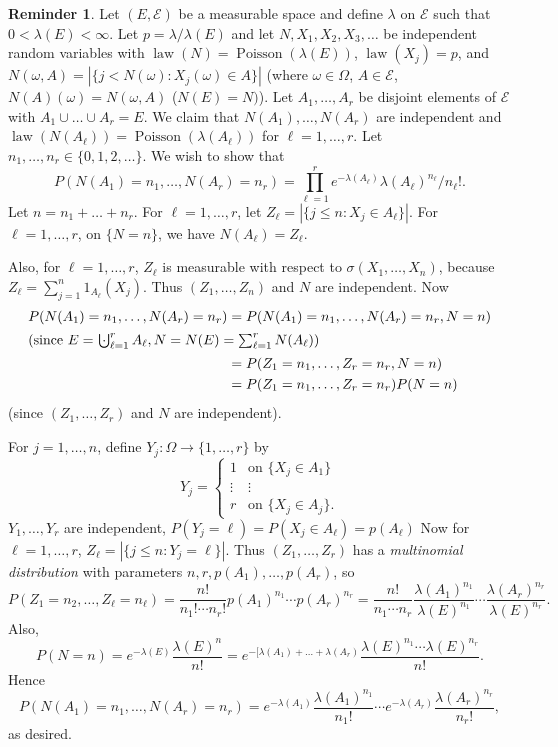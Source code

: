 \documentclass{article}
\DeclareMathOperator{\law}{law}
\DeclareMathOperator{\Poisson}{Poisson}
\newcommand{\bigcupdot}{\mathop{\mathchoice{\hspace{0.45em}}{\hspace{0.35em}}{}{}\cdot\mathchoice{\hspace{-0.85em}}{\hspace{-0.725em}}{}{}\bigcup\limits}}
\theoremstyle{definition}
\newtheorem*{reminder}{Reminder}
\begin{document}
\begin{reminder}
Let $(E, \mathscr{E})$ be a measurable space and define $\lambda$ on $\mathscr{E}$ such that $0 < \lambda(E) < \infty$. Let $p = \lambda/\lambda(E)$ and let $N, X_1, X_2, X_3, \dots$ be independent random variables with $\law(N) = \Poisson(\lambda(E))$, $\law(X_j) = p$, and $N(\omega, A) = |\{j < N(\omega) : X_j(\omega) \in A\}|$ (where $\omega \in \Omega$, $A \in \mathscr{E}$, $N(A)(\omega) = N(\omega, A)$ ($N(E) = N)$). Let $A_1, \dots, A_r$ be disjoint elements of $\mathscr{E}$ with $A_1 \cup \dots \cup A_r = E$. We claim that $N(A_1), \dots, N(A_r)$ are independent and $\law(N(A_\ell)) = \Poisson(\lambda(A_\ell))$ for $\ell = 1, \dots, r$. Let $n_1, \dots, n_r \in \{0, 1, 2, \dots\}$. We wish to show that \[
    P(N(A_1) = n_1, \dots, N(A_r) = n_r) = \prod_{\ell=1}^re^{-\lambda(A_\ell)}\lambda(A_\ell)^{n_\ell}/n_\ell!.
\]
Let $n = n_1 + \dots + n_r$. For $\ell = 1, \dots, r$, let $Z_\ell = |\{j \leq n : X_j \in A_\ell\}|$. For $\ell = 1, \dots, r$, on $\{N = n\}$, we have $N(A_\ell) = Z_\ell$.
\end{reminder}
Also, for $\ell = 1, \dots, r$, $Z_\ell$ is measurable with respect to $\sigma(X_1, \dots, X_n)$, because $Z_\ell = \sum_{j=1}^n 1_{A_\ell} (X_j)$. Thus $(Z_1, \dots, Z_n)$ and $N$ are independent. Now
\begin{align*}
    P(N(A_1) = n_1, \dots, N(A_r) = n_r) &= P(N(A_1) = n_1, \dots, N(A_r) = n_r, N = n) \\
    \intertext{(since $E = \bigcupdot_{\ell = 1}^r A_{\ell}, N = N(E) = \sum_{\ell = 1}^r N(A_\ell)$)}
    &= P(Z_1 = n_1, \dots, Z_r = n_r, N = n) \\
    &= P(Z_1 = n_1, \dots, Z_r = n_r)P(N = n)
\end{align*}
(since $(Z_1, \dots, Z_r)$ and $N$ are independent).

For $j = 1, \dots, n$, define $Y_j : \Omega \to \{1, \dots, r\}$ by
\[
    Y_j = \begin{cases}
        1 &\text{on } \{X_j \in A_1\} \\
        \vdots & \vdots \\
        r &\text{on } \{X_j \in A_j\}.
    \end{cases}
\]
$Y_1, \dots, Y_r$ are independent, $P(Y_j = \ell) = P(X_j \in A_\ell) = p(A_\ell)$
Now for $\ell = 1, \dots, r$, $Z_\ell = |\{j \leq n : Y_j = \ell\}|$. Thus $(Z_1, \dots, Z_r)$ has a \emph{multinomial distribution} with parameters $n, r, p(A_1), \dots, p(A_r)$, so
\[
    P(Z_1 = n_2, \dots, Z_\ell = n_\ell) = \frac{n!}{n_1! \cdots n_r!} p(A_1)^{n_1} \cdots p(A_r)^{n_r} = \frac{n!}{n_1 \cdots n_r} \frac{\lambda(A_1)^{n_1}}{\lambda(E)^{n_1}} \cdots \frac{\lambda(A_r)^{n_r}}{\lambda(E)^{n_r}}.
\]
Also,
\[
    P(N = n) = e^{-\lambda(E)}\frac{\lambda(E)^n}{n!} = e^{-[\lambda(A_1) + \dots + \lambda(A_r)} \frac{\lambda(E)^{n_1}\cdots\lambda(E)^{n_r}}{n!}.
\]
Hence
\[
    P(N(A_1) = n_1, \dots, N(A_r) = n_r) = e^{-\lambda(A_1)} \frac{\lambda(A_1)^{n_1}}{n_1!} \cdots e^{-\lambda(A_r)} \frac{\lambda(A_r)^{n_r}}{n_r!},
\]
as desired.
\end{document}
